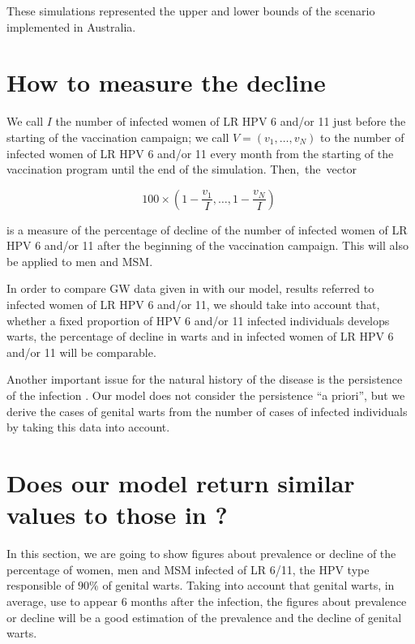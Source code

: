 These simulations represented the upper and lower bounds of the scenario implemented in Australia. 

\section{How to measure the decline}\label{sec:decline}%

We call $I$ the number of infected women of LR HPV 6 and/or 11 just before the starting of the vaccination campaign; we call $V = ( v_1, \ldots, v_N)$ to the number of infected women of LR HPV 6 and/or 11 every month from the starting of the vaccination program until the end of the simulation. Then,~the~vector 

\begin{equation}
100 \times \left( 1-\displaystyle\frac{v_1}{I}, \ldots, 1-\displaystyle\frac{v_N}{I} \right) \; 
\end{equation}

is a measure of the percentage of decline of the number of infected women of LR HPV 6 and/or 11 after the beginning of the vaccination campaign. This will also be applied to men and MSM.

In order to compare GW data given in \cite{ali2013genital} with our model, results referred to infected women of LR HPV 6 and/or 11, we should take into account that, whether a fixed proportion of HPV 6 and/or 11 infected individuals develops warts, the percentage of decline in warts and in infected women of LR HPV 6 and/or 11 will be comparable. 

Another important issue for the natural history of the disease is the persistence of the infection \cite{campos2014updated}. Our model does not consider the persistence ``a priori'', but we derive the cases of genital warts from the number of cases of infected individuals by taking this data into account.

\section{Does our model return similar values to those in \cite{ali2013genital}?}

In this section, we are going to show figures about prevalence or decline of the percentage of women, men and MSM infected of LR 6/11, the HPV type responsible of $90\%$ of genital warts. Taking into account that genital warts, in average, use to appear 6 months after the infection, the figures about prevalence or decline will be a good estimation of the prevalence and the  decline of genital warts.  

